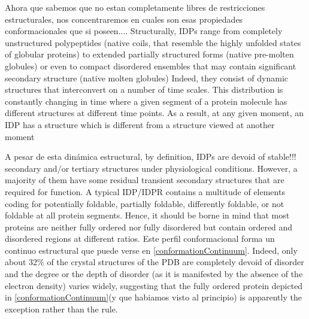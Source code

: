 
Ahora que sabemos que no estan completamente libres de restricciones estructurales, nos concentraremos en cuales son esas propiedades conformacionales que si poseen....
Structurally, IDPs range from completely unstructured polypeptides (native coils, that resemble the highly unfolded states of globular proteins) 
to extended partially structured forms (native pre-molten globules) or even to compact disordered ensembles that may contain significant secondary structure (native molten globules)
Indeed, they consist of dynamic structures that interconvert on a number of time scales.
This distribution is constantly changing in time where a given segment of a protein molecule has different structures at different time points. 
As a result, at any given moment, an IDP has a structure which is different from a structure viewed at another moment


A pesar de esta dinámica estructural, by definition, IDPs are devoid of stable!!! secondary and/or tertiary structures under physiological conditions.
However, a majority of them have some residual transient secondary structures that are required for function.
A typical IDP/IDPR contains a multitude of elements coding for potentially foldable, partially foldable, differently foldable, or not foldable at all protein segments.
Hence, it should be borne in mind that most proteins are neither fully ordered nor fully disordered but contain ordered and disordered regions at different ratios.
Este perfil conformacional forma un continuo estructural que puede verse en \ref{conformationContinuum}.
Indeed, only about 32\% of the crystal structures of the PDB are completely devoid of disorder and the degree or the depth of disorder (as it is manifested by the absence of the electron density) varies widely, 
suggesting that the fully ordered protein depicted in \ref{conformationContinuum}(y que habiamos visto al principio) is apparently the exception rather than the rule.



